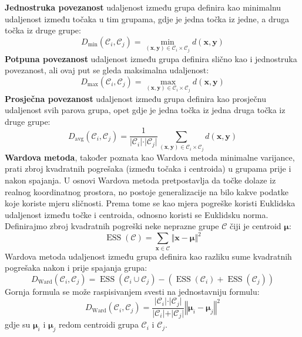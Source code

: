 \documentclass[times, utf8, zavrsni]{fer}
\begin{document}
\textbf{Jednostruka povezanost}  udaljenost između grupa definira kao minimalnu udaljenost između točaka u tim grupama, gdje je jedna točka iz jedne, a druga točka iz druge grupe:
\[D_{\text{min}} \left( \mathcal{C}_i, \mathcal{C}_j \right) 
        = \min_{\left(\mathbf{x}, \mathbf{y}\right) \in \mathcal{C}_i \times \mathcal{C}_j} d\left(\mathbf{x}, \mathbf{y}\right)
\]
\textbf{Potpuna povezanost}  udaljenost između grupa definira slično kao i jednostruka povezanost, ali ovaj put se gleda maksimalna udaljenost:
\[D_{\text{max}} \left( \mathcal{C}_i, \mathcal{C}_j \right) 
        = \max_{\left(\mathbf{x}, \mathbf{y}\right) \in \mathcal{C}_i \times \mathcal{C}_j} d\left(\mathbf{x}, \mathbf{y}\right)
\]
\textbf{Prosječna povezanost}  udaljenost između grupa definira kao prosječnu udaljenost svih parova grupa, opet gdje je jedna točka iz jedna druga točka iz druge grupe:
\[D_{\text{avg}} \left( \mathcal{C}_i, \mathcal{C}_j \right) 
        = \frac{1}{\vert \mathcal{C}_i \vert \cdot \vert \mathcal{C}_j \vert} 
            \sum_{\left(\mathbf{x}, \mathbf{y}\right) \in \mathcal{C}_i \times \mathcal{C}_j} d\left(\mathbf{x}, \mathbf{y}\right)
\]
\textbf{Wardova metoda}, također poznata kao Wardova metoda minimalne varijance, prati zbroj kvadratnih pogrešaka (između točaka i centroida) u grupama prije i nakon spajanja. U osnovi Wardova metoda pretpostavlja da točke dolaze iz realnog koordinatnog prostora, no postoje generalizacije na bilo kakve podatke koje koriste mjeru sličnosti. Prema tome se kao mjera pogreške koristi Euklidska udaljenost između točke i centroida, odnosno koristi se Euklidsku norma. Definirajmo zbroj kvadratnih pogreški  neke neprazne grupe $\mathcal{C}$ čiji je centroid $\boldsymbol{\mu}$:
\[\operatorname{ESS} \left(\mathcal{C}\right) = \sum_{\mathbf{x} \in \mathcal{C}} 
\Vert \mathbf{x} - \boldsymbol{\mu} \Vert^2\]
Wardova metoda udaljenost između grupa definira kao razliku sume kvadratnih pogrešaka nakon i prije spajanja grupa:
\[D_{\text{Ward}} \left( \mathcal{C}_i, \mathcal{C}_j \right) 
= \operatorname{ESS} \left(\mathcal{C}_i \cup \mathcal{C}_j\right) - \left(\operatorname{ESS} \left(\mathcal{C}_i\right) + \operatorname{ESS} \left(\mathcal{C}_j\right)\right)
\]
Gornja formula se može raspisivanjem svesti na jednostavniju formulu:
\[D_{\text{Ward}} \left( \mathcal{C}_i, \mathcal{C}_j \right)
= \frac{\vert \mathcal{C}_i \vert \cdot \vert \mathcal{C}_j \vert}
{\vert \mathcal{C}_i \vert + \vert \mathcal{C}_j \vert}
\left\Vert \boldsymbol{\mu}_i - \boldsymbol{\mu}_j \right\Vert^2
\]
gdje su $\boldsymbol{\mu}_i$ i $\boldsymbol{\mu}_j$ redom centroidi grupa $\mathcal{C}_i$ i $\mathcal{C}_j$.
\end{document}

